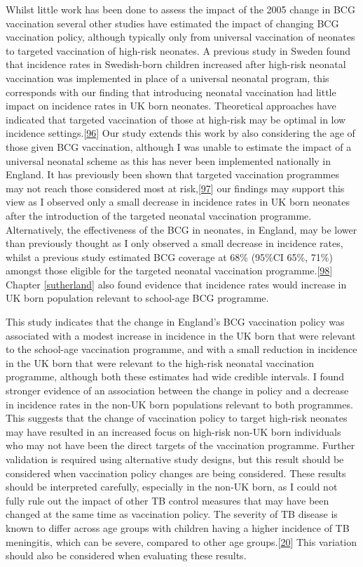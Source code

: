 \documentclass[11pt,twoside]{bristolthesis}
\begin{document}
  Whilst little work has been done to assess the impact of the 2005 change in BCG vaccination several other studies have estimated the impact of changing BCG vaccination policy, although typically only from universal vaccination of neonates to targeted vaccination of high-risk neonates. A previous study in Sweden found that incidence rates in Swedish-born children increased after high-risk neonatal vaccination was implemented in place of a universal neonatal program, this corresponds with our finding that introducing neonatal vaccination had little impact on incidence rates in UK born neonates. Theoretical approaches have indicated that targeted vaccination of those at high-risk may be optimal in low incidence settings.{[}\protect\hyperlink{ref-Manissero2008}{96}{]} Our study extends this work by also considering the age of those given BCG vaccination, although I was unable to estimate the impact of a universal neonatal scheme as this has never been implemented nationally in England. It has previously been shown that targeted vaccination programmes may not reach those considered most at risk,{[}\protect\hyperlink{ref-Feiring2016}{97}{]} our findings may support this view as I observed only a small decrease in incidence rates in UK born neonates after the introduction of the targeted neonatal vaccination programme. Alternatively, the effectiveness of the BCG in neonates, in England, may be lower than previously thought as I only observed a small decrease in incidence rates, whilst a previous study estimated BCG coverage at 68\% (95\%CI 65\%, 71\%) amongst those eligible for the targeted neonatal vaccination programme.{[}\protect\hyperlink{ref-Nguipdop-Djomo2014}{98}{]} Chapter \ref{sutherland} also found evidence that incidence rates would increase in UK born population relevant to school-age BCG programme.
  
  This study indicates that the change in England's BCG vaccination policy was associated with a modest increase in incidence in the UK born that were relevant to the school-age vaccination programme, and with a small reduction in incidence in the UK born that were relevant to the high-risk neonatal vaccination programme, although both these estimates had wide credible intervals. I found stronger evidence of an association between the change in policy and a decrease in incidence rates in the non-UK born populations relevant to both programmes. This suggests that the change of vaccination policy to target high-risk neonates may have resulted in an increased focus on high-risk non-UK born individuals who may not have been the direct targets of the vaccination programme. Further validation is required using alternative study designs, but this result should be considered when vaccination policy changes are being considered. These results should be interpreted carefully, especially in the non-UK born, as I could not fully rule out the impact of other TB control measures that may have been changed at the same time as vaccination policy. The severity of TB disease is known to differ across age groups with children having a higher incidence of TB meningitis, which can be severe, compared to other age groups.{[}\protect\hyperlink{ref-PHE2016a}{20}{]} This variation should also be considered when evaluating these results.
  
\end{document}
